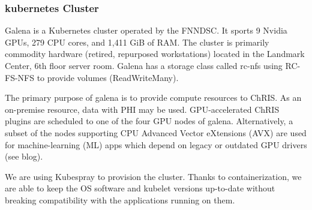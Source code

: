 \documentclass[11pt]{amsart}
\begin{document}
\hypertarget{x-kubernetes-cluster}{\subsubsection*{kubernetes Cluster}}
Galena is a Kubernetes cluster operated by the FNNDSC. It sports 9 Nvidia GPUs, 279 CPU cores, and 1,411 GiB of RAM. The cluster is primarily commodity hardware (retired, repurposed workstations) located in the Landmark Center, 6th floor server room. Galena has a storage class called rc-nfs using RC-FS-NFS to provide volumes (ReadWriteMany).


The primary purpose of galena is to provide compute resources to ChRIS. As an on-premise resource, data with PHI may be used. GPU-accelerated ChRIS plugins are scheduled to one of the four GPU nodes of galena. Alternatively, a subset of the nodes supporting CPU Advanced Vector eXtensions (AVX) are used for machine-learning (ML) apps which depend on legacy or outdated GPU drivers (see blog).


We are using Kubespray to provision the cluster. Thanks to containerization, we are able to keep the OS software and kubelet versions up-to-date without breaking compatibility with the applications running on them.
\end{document}
